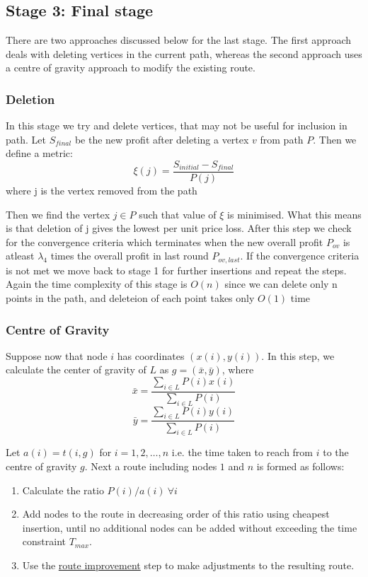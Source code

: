 \documentclass{article}
\begin{document}
\subsection{Stage 3: Final stage}

There are two approaches discussed below for the last stage. The first approach deals with deleting vertices in the current path, whereas the second
approach uses a centre of gravity approach \cite{apps1} to modify the existing route.
\subsubsection{Deletion}

In this stage we try and delete vertices, that may not be useful for inclusion in path.
Let $S_{final}$ be the new profit after deleting a vertex $v$ from path $P$. Then we define a metric: 
\begin{equation}  \label{eq5}
    \xi (j)= \frac{S_{initial} - S_{final}}{P(j)}
\end{equation}
where j is the vertex removed from the path

Then we find the vertex $j \in P$ such that value of $\xi$ is minimised. What this means is that deletion of j gives the lowest per unit price loss.
After this step we check for the convergence criteria which terminates when the new overall profit $P_{ov}$ is atleast $\lambda_4$ times the overall profit in last round $P_{ov,last}$.
If the convergence criteria is not met we move back to stage 1 for further insertions and repeat the steps. 
Again the time complexity of this stage is $O(n)$ since we can delete only n points in the path, and deleteion of each point takes only $O(1)$ time

\subsubsection{Centre of Gravity}
Suppose now that node $i$ has coordinates $(x(i),y(i))$. In this step, we calculate
the center of gravity of $L$ as $g = (\bar{x} ,\bar{y})$, where
\begin{equation}  \label{eq6}
    \bar{x} =  \frac{\sum_{i \in L} P(i) x(i)}{\sum_{i \in L} P(i)}
\end{equation}
\begin{equation}  \label{eq6.2}
    \bar{y} =  \frac{\sum_{i \in L} P(i) y(i)}{\sum_{i \in L} P(i)}
\end{equation}

Let $a(i) = t(i,g)$ for $i = 1, 2, \ldots ,n$ i.e. the time taken to reach from $i$ to the centre of gravity $g$. Next a route including nodes $1$ and $n$ is formed as follows:
\begin{enumerate}
    \item Calculate the ratio $P(i)/a(i)\ \forall i$
    \item Add nodes to the route in decreasing order of this ratio using cheapest insertion, until no additional nodes can be added without exceeding the time constraint $T_{max}$.
    \item Use the \hyperref[kopt]{route improvement} step to make adjustments to the resulting
          route.
\end{enumerate}
\end{document}
